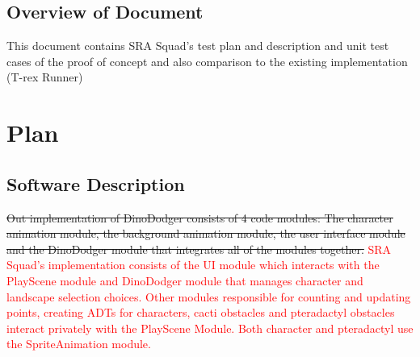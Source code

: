 \documentclass[12pt, titlepage]{article}
\begin{document}





\subsection{Overview of Document}
This document contains SRA Squad's test plan and description and unit test cases of the proof of concept and also comparison to the existing implementation (T-rex Runner)

\section{Plan}	
\subsection{Software Description}
\sout{Out implementation of DinoDodger consists of 4 code modules: The character animation module, the background animation module, the user interface module and the DinoDodger module that integrates all of the modules together.} \textcolor{red}{SRA Squad's implementation consists of the UI module which interacts with the PlayScene module and DinoDodger module that manages character and landscape selection choices. Other modules responsible for counting and updating points, creating ADTs for characters, cacti obstacles and pteradactyl obstacles interact privately with the PlayScene Module. Both character and pteradactyl use the SpriteAnimation module.}
\end{document}
